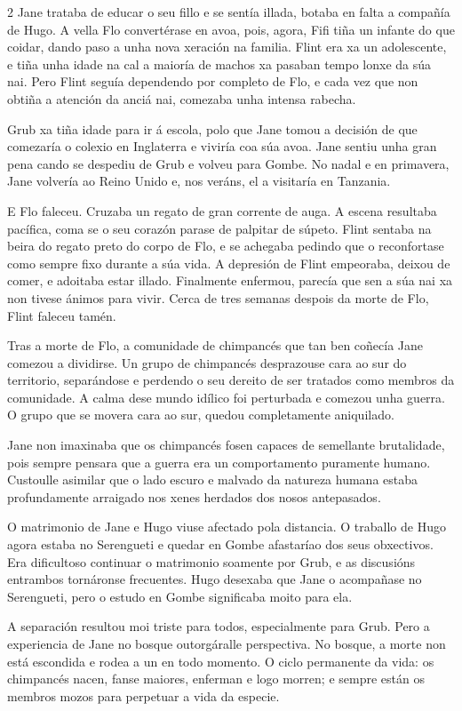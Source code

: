 \begin{multicols}{2}
Jane trataba de educar o seu fillo e se sentía illada, botaba en falta a
compañía de Hugo. A vella Flo convertérase en avoa, pois, agora, Fifi tiña un
infante do que coidar, dando paso a unha nova xeración na familia. Flint era xa
un adolescente, e tiña unha idade na cal a maioría de machos xa pasaban tempo
lonxe da súa nai. Pero Flint seguía dependendo por completo de Flo, e cada vez
que non obtiña a atención da anciá nai, comezaba unha intensa rabecha.

Grub xa tiña idade para ir á escola, polo que Jane tomou a decisión de que
comezaría o colexio en Inglaterra e viviría coa súa avoa. Jane sentiu unha gran
pena cando se despediu de Grub e volveu para Gombe. No nadal e en primavera,
Jane volvería ao Reino Unido e, nos veráns, el a visitaría en Tanzania.

E Flo faleceu. Cruzaba un regato de gran corrente de auga. A escena resultaba
pacífica, coma se o seu corazón parase de palpitar de súpeto. Flint sentaba na
beira do regato preto do corpo de Flo, e se achegaba pedindo que o reconfortase
como sempre fixo durante a súa vida. A depresión de Flint empeoraba, deixou de
comer, e adoitaba estar illado. Finalmente enfermou, parecía que sen a súa nai
xa non tivese ánimos para vivir. Cerca de tres semanas despois da morte de Flo,
Flint faleceu tamén.

Tras a morte de Flo, a comunidade de chimpancés que tan ben coñecía Jane
comezou a dividirse. Un grupo de chimpancés desprazouse cara ao sur do
territorio, separándose e perdendo o seu dereito de ser tratados como membros
da comunidade. A calma dese mundo idílico foi perturbada e comezou unha guerra.
O grupo que se movera cara ao sur, quedou completamente aniquilado.

Jane non imaxinaba que os chimpancés fosen capaces de semellante brutalidade,
pois sempre pensara que a guerra era un comportamento puramente humano.
Custoulle asimilar que o lado escuro e malvado da natureza humana estaba
profundamente arraigado nos xenes herdados dos nosos antepasados.

O matrimonio de Jane e Hugo viuse afectado pola distancia. O traballo de Hugo
agora estaba no Serengueti e quedar en Gombe afastaríao dos seus obxectivos.
Era dificultoso continuar o matrimonio soamente por Grub, e as discusións
entrambos tornáronse frecuentes. Hugo desexaba que Jane o acompañase no
Serengueti, pero o estudo en Gombe significaba moito para ela.

A separación resultou moi triste para todos, especialmente para Grub. Pero a
experiencia de Jane no bosque outorgáralle perspectiva. No bosque, a morte non
está escondida e rodea a un en todo momento. O ciclo permanente da vida: os
chimpancés nacen, fanse maiores, enferman e logo morren; e sempre están os
membros mozos para perpetuar a vida da especie.


\end{multicols}
